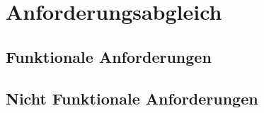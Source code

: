 \chapter{Anforderungsabgleich}
\label{cha:anforderungsabgleich}

\section{Funktionale Anforderungen}
\label{sec:anforderungsabgleich:funktional}


\section{Nicht Funktionale Anforderungen}
\label{sec:anforderungsabgleich:nichtfunktional}